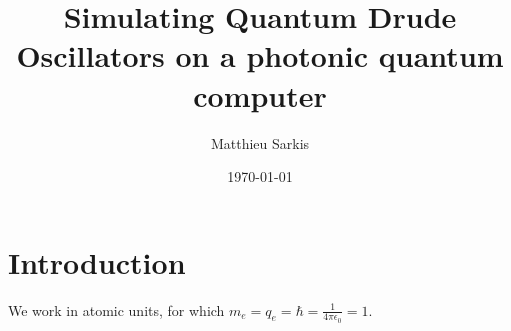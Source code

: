 \documentclass[reprint, amsmath, amssymb, aps]{revtex4-2}
\begin{document}
\preprint{}

\title{Simulating Quantum Drude Oscillators on a photonic quantum computer}

\author{Matthieu Sarkis}

\author{}
\email{}
\affiliation{
}


\date{\today}

\begin{abstract}
\end{abstract}

\maketitle


\section{Introduction}

    We work in atomic units, for which $m_e=q_e=\hbar=\frac{1}{4\pi\epsilon_0}=1$.
\end{document}
